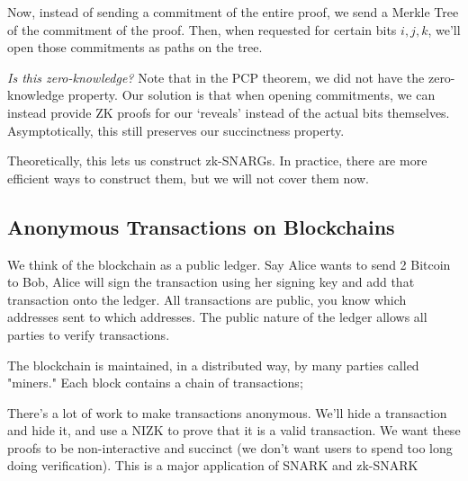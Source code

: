 Now, instead of sending a commitment of the entire proof, we send a Merkle Tree of the commitment of the proof. Then, when requested for certain bits $i, j, k$, we'll open those commitments as paths on the tree.

\emph{Is this zero-knowledge?} Note that in the PCP theorem, we did not have the zero-knowledge property. Our solution is that when opening commitments, we can instead provide ZK proofs for our `reveals' instead of the actual bits themselves. Asymptotically, this still preserves our succinctness property.

Theoretically, this lets us construct zk-SNARGs. In practice, there are more efficient ways to construct them, but we will not cover them now.

\subsection{Anonymous Transactions on Blockchains}

We think of the blockchain as a public ledger. Say Alice wants to send 2 Bitcoin to Bob, Alice will sign the transaction using her signing key and add that transaction onto the ledger. All transactions are public, you know which addresses sent to which addresses. The public nature of the ledger allows all parties to verify transactions.

The blockchain is maintained, in a distributed way, by many parties called "miners." Each block contains a chain of transactions;


There's a lot of work to make transactions anonymous. We'll hide a transaction and hide it, and use a NIZK to prove that it is a valid transaction. We want these proofs to be non-interactive and succinct (we don't want users to spend too long doing verification). This is a major application of SNARK and zk-SNARK

